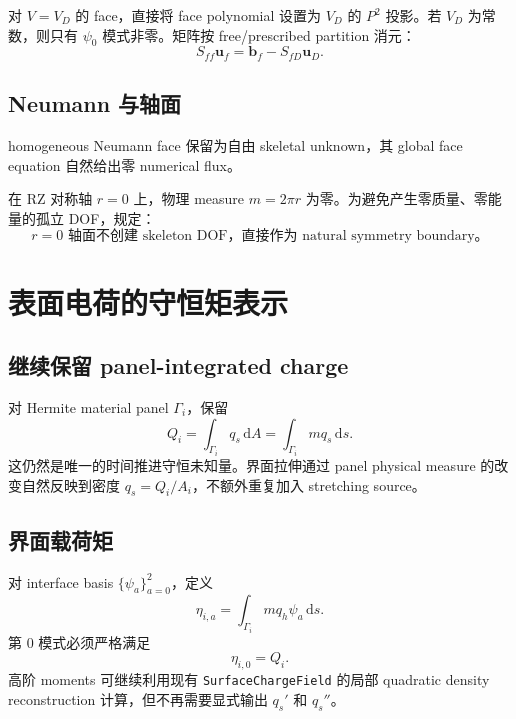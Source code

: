 \documentclass[UTF8,a4paper,11pt]{ctexart}
\newcommand{\dd}{\mathrm{d}}
\newcommand{\vct}[1]{\bm{#1}}
\begin{document}
对 \(V=V_D\) 的 face，直接将 face polynomial 设置为 \(V_D\) 的 \(P^2\) 投影。若 \(V_D\) 为常数，则只有 \(\psi_0\) 模式非零。矩阵按 free/prescribed partition 消元：
\[
S_{ff}\vct u_f
=\vct b_f-S_{fD}\vct u_D.
\]

\subsection{Neumann 与轴面}

homogeneous Neumann face 保留为自由 skeletal unknown，其 global face equation 自然给出零 numerical flux。

在 RZ 对称轴 \(r=0\) 上，物理 measure \(m=2\pi r\) 为零。为避免产生零质量、零能量的孤立 DOF，规定：
\begin{equation}
\boxed{r=0\text{ 轴面不创建 skeleton DOF，直接作为 natural symmetry boundary。}}
\label{eq:axis_rule}
\end{equation}

\section{表面电荷的守恒矩表示}

\subsection{继续保留 panel-integrated charge}

对 Hermite material panel \(\Gamma_i\)，保留
\begin{equation}
\boxed{
Q_i=\int_{\Gamma_i}q_s\,\dd A
=\int_{\Gamma_i}m q_s\,\dd s.
}
\label{eq:panel_charge}
\end{equation}
这仍然是唯一的时间推进守恒未知量。界面拉伸通过 panel physical measure 的改变自然反映到密度 \(q_s=Q_i/A_i\)，不额外重复加入 stretching source。

\subsection{界面载荷矩}

对 interface basis \(\{\psi_a\}_{a=0}^2\)，定义
\begin{equation}
\eta_{i,a}
=\int_{\Gamma_i}m q_h\psi_a\,\dd s.
\label{eq:charge_moments}
\end{equation}
第 0 模式必须严格满足
\begin{equation}
\boxed{\eta_{i,0}=Q_i.}
\label{eq:charge_constant_moment}
\end{equation}
高阶 moments 可继续利用现有 \texttt{SurfaceChargeField} 的局部 quadratic density reconstruction 计算，但不再需要显式输出 \(q_s'\) 和 \(q_s''\)。
\end{document}

